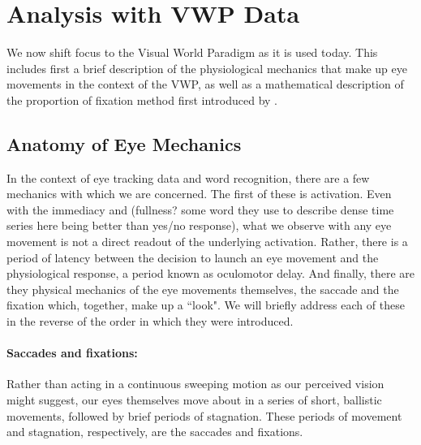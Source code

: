 \section{Analysis with VWP Data}

We now shift focus to the Visual World Paradigm as it is used today. This includes first a brief description of the physiological mechanics that make up eye movements in the context of the VWP, as well as a mathematical description of the proportion of fixation method first introduced by \citet{allopenna1998tracking}.  



\subsection{Anatomy of Eye Mechanics}

In the context of eye tracking data and word recognition, there are a few mechanics with which we are concerned. The first of these is activation. Even with the immediacy and (fullness? some word they use to describe dense time series here being better than yes/no response), what we observe with any eye movement is not a direct readout of the underlying activation.  Rather, there is a period of latency between the decision to launch an eye movement and the physiological response, a period known as oculomotor delay. And finally, there are they physical mechanics of the eye movements themselves, the saccade and the fixation which, together, make up a ``look". We will briefly address each of these in the reverse of the order in which they were introduced.


\paragraph{Saccades and fixations:} Rather than acting in a continuous sweeping motion as our perceived vision might suggest, our eyes themselves move about in a series of short, ballistic movements, followed by brief periods of stagnation. These periods of movement and stagnation, respectively, are the saccades and fixations. 

